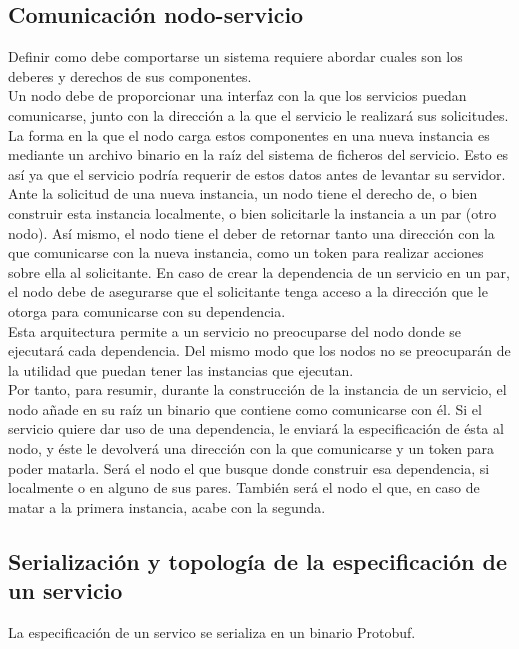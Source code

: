 \documentclass[11pt]{article}
\begin{document}
		\subsection{Comunicación nodo-servicio}
			Definir como debe comportarse un sistema requiere abordar cuales son los deberes y derechos de sus componentes. \\

			Un nodo debe de proporcionar una interfaz con la que los servicios puedan comunicarse, junto con la dirección
			a la que el servicio le realizará sus solicitudes. La forma en la que el nodo carga estos componentes en una nueva instancia
			es mediante un archivo binario en la raíz del sistema de ficheros del servicio. Esto es así ya que el servicio podría requerir de
			estos datos antes de levantar su servidor. \\

			Ante la solicitud de una nueva instancia, un nodo tiene el derecho de, o bien construir esta instancia localmente, o bien solicitarle la instancia
			a un par (otro nodo). Así mismo, el nodo tiene el deber de retornar tanto una dirección con la que comunicarse con la nueva instancia, como un token
			para realizar acciones sobre ella al solicitante.
			En caso de crear la dependencia de un servicio en un par, el nodo debe de asegurarse que el solicitante tenga acceso a la dirección que le otorga para
			comunicarse con su dependencia. \\

			Esta arquitectura permite a un servicio no preocuparse del nodo donde se ejecutará cada dependencia. Del mismo modo que los nodos no se preocuparán de
			la utilidad que puedan tener las instancias que ejecutan. \\
			
			Por tanto, para resumir, durante la construcción de la instancia de un servicio, el nodo añade en su raíz un binario que contiene como comunicarse con él.
			Si el servicio quiere dar uso de una dependencia, le enviará la especificación de ésta al nodo, y éste le devolverá una dirección con la que comunicarse y
			un token para poder matarla. Será el nodo el que busque donde construir esa dependencia, si localmente o en alguno de sus pares. También será el nodo el que,
			en caso de matar a la primera instancia, acabe con la segunda.

		\subsection{Serialización y topología de la especificación de un servicio}
			La especificación de un servico se serializa en un binario Protobuf. \\
\end{document}

